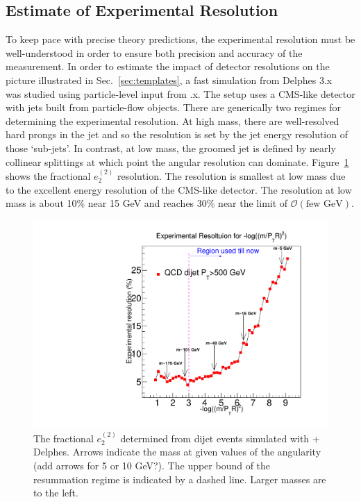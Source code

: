\subsection{Estimate of Experimental Resolution}
\label{sec:resolution}

To keep pace with precise theory predictions, the experimental resolution must be well-understood in order to ensure both precision and accuracy of the measurement.  In order to estimate the impact of detector resolutions on the picture illustrated in Sec.~\ref{sec:templates}, a fast simulation from Delphes 3.x~\cite{deFavereau:2013fsa} was studied using particle-level input from \pythia.x.  The setup uses a CMS-like detector with jets built from particle-flow objects.  There are generically two regimes for determining the experimental resolution.  At high mass, there are well-resolved hard prongs in the jet and so the resolution is set by the jet energy resolution of those `sub-jets'.  In contrast, at low mass, the groomed jet is defined by nearly collinear splittings at which point the angular resolution can dominate.  Figure~\ref{fig:resolution} shows the fractional $e_2^{(2)}$ resolution.  The resolution is smallest at low mass due to the excellent energy resolution of the CMS-like detector.  The resolution at low mass is about 10\% near 15 GeV and reaches 30\% near the limit of $\mathcal{O}(\text{few GeV})$.  

\begin{figure}[h!]
\begin{center}
\includegraphics[width = 0.49\columnwidth]{figures/experimentaldemo/Resolution_plot_logrho_updated.pdf}
\end{center}
\caption{The fractional $e_2^{(2)}$ determined from dijet events simulated with \pythia + Delphes.  Arrows indicate the mass at given values of the angularity (add arrows for 5 or 10 GeV?).  The upper bound of the resummation regime is indicated by a dashed line.  Larger masses are to the left.}
\label{fig:resolution}
\end{figure}

